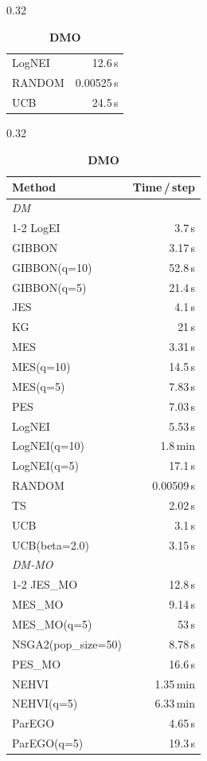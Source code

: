 \begin{table}[h]
\begin{subtable}[t]{0.32\textwidth}
\begin{tabular}{lr}
      LogNEI & 12.6\,s \\
      RANDOM & 0.00525\,s \\
      UCB & 24.5\,s \\
      \bottomrule
    \end{tabular}
  \end{subtable}
  \hfill
  \begin{subtable}[t]{0.32\textwidth}
    \centering
    \footnotesize
    \caption{\textbf{DMO}}
    \begin{tabular}{lr}
      \toprule
      \textbf{Method} & \textbf{Time\,/\,step} \\
      \midrule
      \multicolumn{2}{l}{\textit{DM}} \\
      \cmidrule{1-2}
      LogEI & 3.7\,s \\
      GIBBON & 3.17\,s \\
      GIBBON(q=10) & 52.8\,s \\
      GIBBON(q=5) & 21.4\,s \\
      JES & 4.1\,s \\
      KG & 21\,s \\
      MES & 3.31\,s \\
      MES(q=10) & 14.5\,s \\
      MES(q=5) & 7.83\,s \\
      PES & 7.03\,s \\
      LogNEI & 5.53\,s \\
      LogNEI(q=10) & 1.8\,min \\
      LogNEI(q=5) & 17.1\,s \\
      RANDOM & 0.00509\,s \\
      TS & 2.02\,s \\
      UCB & 3.1\,s \\
      UCB(beta=2.0) & 3.15\,s \\
      \midrule
      \multicolumn{2}{l}{\textit{DM-MO}} \\
      \cmidrule{1-2}
      JES\_MO & 12.8\,s \\
      MES\_MO & 9.14\,s \\
      MES\_MO(q=5) & 53\,s \\
      NSGA2(pop\_size=50) & 8.78\,s \\
      PES\_MO & 16.6\,s \\
      NEHVI & 1.35\,min \\
      NEHVI(q=5) & 6.33\,min \\
      ParEGO & 4.65\,s \\
      ParEGO(q=5) & 19.3\,s \\

\end{tabular}
\end{subtable}
\end{table}
